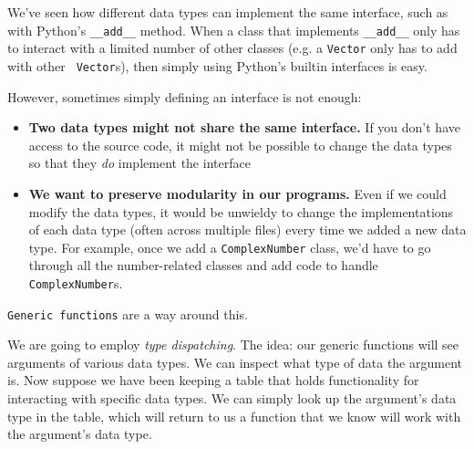 We've seen how different data types can implement the same interface,
such as with Python's {\tt \_\_add\_\_} method. When a class that
implements {\tt \_\_add\_\_} only has to interact with a limited number
of other classes (e.g. a {\tt Vector} only has to add with other {\tt
Vector}s), then simply using Python's builtin interfaces is easy.

However, sometimes simply defining an interface is not enough:
\begin{itemize}
    \item \textbf{Two data types might not share the same interface.}
        If you don't have access to the source code, it might not be
        possible to change the data types so that they \emph{do}
        implement the interface
    \item \textbf{We want to preserve modularity in our programs.} Even
        if we could modify the data types, it would be unwieldy to
        change the implementations of each data type (often across
        multiple files) every time we added a new data type. For
        example, once we add a {\tt ComplexNumber} class, we'd have to
        go through all the number-related classes and add code to
        handle {\tt ComplexNumber}s.
\end{itemize}

{\tt Generic functions} are a way around this.

We are going to employ \emph{type dispatching}. The idea: our generic
functions will see arguments of various data types. We can inspect what
type of data the argument is. Now suppose we have been keeping a table
that holds functionality for interacting with specific data types. We
can simply look up the argument's data type in the table, which will
return to us a function that we know will work with the argument's data
type.
